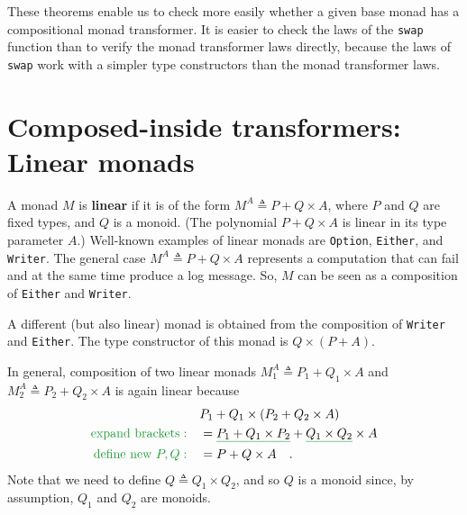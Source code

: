 These theorems enable us to check more easily whether a given base
monad has a compositional monad transformer. It is easier to check
the laws of the \lstinline!swap!
function than to verify the monad transformer laws directly, because
the laws of \lstinline!swap!
work with a simpler type constructors than the monad transformer laws.

\section{Composed-inside transformers: Linear monads\label{sec:transformers-linear-monads}}

A monad $M$ is \textbf{linear} if it is of
the form $M^{A}\triangleq P+Q\times A$, where $P$ and $Q$ are fixed
types, and $Q$ is a monoid. (The polynomial $P+Q\times A$ is linear
in its type parameter $A$.) Well-known examples of linear monads
are \lstinline!Option!,
\lstinline!Either!, and
\lstinline!Writer!. The
general case $M^{A}\triangleq P+Q\times A$ represents a computation
that can fail and at the same time produce a log message. So, $M$
can be seen as a composition of \lstinline!Either!
and \lstinline!Writer!.

A different (but also linear) monad is obtained from the composition
of \lstinline!Writer! and
\lstinline!Either!. The
type constructor of this monad is $Q\times\left(P+A\right)$.

In general, composition of two linear monads $M_{1}^{A}\triangleq P_{1}+Q_{1}\times A$
and $M_{2}^{A}\triangleq P_{2}+Q_{2}\times A$ is again linear because
\begin{align*}
 & P_{1}+Q_{1}\times\left(P_{2}+Q_{2}\times A\right)\\
{\color{greenunder}\text{expand brackets}:}\quad & =\gunderline{P_{1}+Q_{1}\times P_{2}}+\gunderline{Q_{1}\times Q_{2}}\times A\\
{\color{greenunder}\text{define new }P,Q:}\quad & =P+Q\times A\quad.
\end{align*}
Note that we need to define $Q\triangleq Q_{1}\times Q_{2}$, and
so $Q$ is a monoid since, by assumption, $Q_{1}$ and $Q_{2}$ are
monoids.

